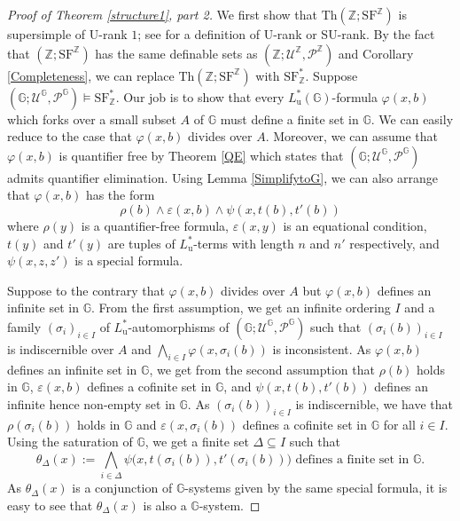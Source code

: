 \documentclass[letterpaper]{amsart}
\newcommand{\zz}{\mathbb{Z}}
\renewcommand{\gg}{\mathbb{G}}
\newcommand{\sU}{\mathscr{U}}
\newcommand{\sP}{\mathscr{P}}
\newcommand{\SF}{\mathrm{SF}^\zz}
\newcommand{\TSFZ}{\mathrm{SF}^*_{\zz}}
\begin{document}
\begin{proof}[Proof of Theorem \ref{structure1}, part 2]
We first show that $\text{Th}(\zz; \SF)$  is supersimple of U-rank $1$;  see \cite[p. 36]{Kim} for a definition of U-rank or SU-rank. By  the fact that $(\zz; \SF)$ has the same definable sets as  $(\zz; \sU^\zz, \sP^\zz)$ and  Corollary \ref{Completeness}, we can replace $\text{Th}(\zz; \SF)$ with $\TSFZ$. Suppose $(\gg; \sU^\gg, \sP^\gg) \models \TSFZ$. Our job is to show that every $L^*_{\mathrm{u}}(\gg)$-formula $\varphi(x,b)$ which forks over a small subset $A$ of $\gg $ must define a finite set in  $\gg$.  We can easily reduce to the case that $\varphi(x,b)$ divides over $A$. Moreover, we can assume that $\varphi(x,b)$ is quantifier free by Theorem \ref{QE} which states that $(\gg; \sU^\gg, \sP^\gg)$ admits quantifier elimination. Using Lemma \ref{SimplifytoG}, we can also arrange that $\varphi(x, b)$ has the form 
$$ \rho(b) \wedge  \varepsilon(x, b) \wedge  \psi(x, t(b), t'(b))   $$
where  $\rho(y)$ is a quantifier-free formula, $\varepsilon(x,y)$ is an equational condition, $t(y)$ and $t'(y)$ are tuples of $L^*_{\mathrm{u}}$-terms with length $n$ and $n'$ respectively, and $\psi(x, z, z')$ is a special formula. 



 Suppose to the contrary  that $\varphi(x,b)$ divides over $A$ but $\varphi(x,b)$ defines an infinite set in $\gg$.
From the first assumption, we get an infinite ordering $I$ and a family $(\sigma_i)_{i \in I}$ of $L^*_{\mathrm{u}}$-automorphisms of $(\gg; \sU^\gg, \sP^\gg)$ such that $(\sigma_i (b))_{i \in I}$ is indiscernible over $A$ and $\bigwedge_{i \in I} \varphi(x, \sigma_i (b))$ is inconsistent. As $\varphi(x,b)$ defines an infinite set in $\gg$,  we get from the second assumption that $\rho(b)$ holds in $\gg$,
$\varepsilon(x, b)$ defines a cofinite set in $\gg$, and $\psi(x,t(b), t'(b))$ defines an infinite hence non-empty set in $\gg$. As $(\sigma_i (b))_{i \in I}$ is indiscernible, we have that $\rho(\sigma_i (b))$ holds in $\gg$ and $\varepsilon(x, \sigma_i (b))$ defines a cofinite set in $\gg$ for all $i \in I$. Using the saturation of $\gg$, we get a finite set $\Delta \subseteq I$ such that  
$$ \theta_{\Delta}(x):= \bigwedge_{i \in \Delta}  \psi\big(x, t(\sigma_i (b)), t'(\sigma_i (b))\big)  \text{ defines a  finite set in } \gg. $$
As $\theta_{\Delta}(x)$ is a conjunction of $\gg$-systems given by the same special formula, it is easy to see that $\theta_{\Delta}(x)$ is also a $\gg$-system. 


\end{proof}
\end{document}
